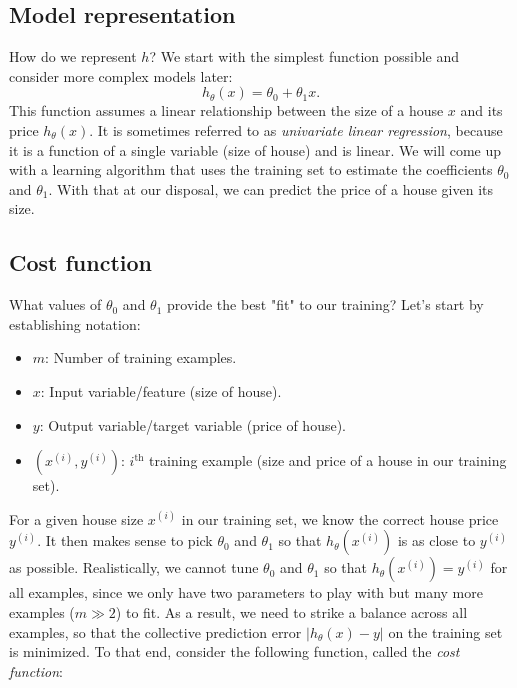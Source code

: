 \documentclass{article}
\theoremstyle{definition}
\begin{document}
\subsection{Model representation}
How do we represent $h$? We start with the simplest function possible and consider more complex models later:
\begin{equation}
    h_{\theta}(x) = \theta_0 + \theta_1 x.
    \label{linreg-eq:univar-hypothesis}
\end{equation}
This function assumes a linear relationship between the size of a house $x$ and its price $h_{\theta}(x)$. It is sometimes referred to as \textit{univariate linear regression}, because it is a function of a single variable (size of house) and is linear. We will come up with a learning algorithm that uses the training set to estimate the coefficients $\theta_0$ and $\theta_1$. With that at our disposal, we can predict the price of a house given its size. 

\subsection{Cost function}
What values of $\theta_0$ and $\theta_1$ provide the best "fit" to our training? Let's start by establishing notation:
\begin{itemize}
    \item $m$: Number of training examples.
    \item $x$: Input variable/feature (size of house).
    \item $y$: Output variable/target variable (price of house).
    \item $(x^{(i)}, y^{(i)})$: $i^{\text{th}}$ training example (size and price of a house in our training set).
\end{itemize}

For a given house size $x^{(i)}$ in our training set, we know the correct house price $y^{(i)}$. It then makes sense to pick $\theta_0$ and $\theta_1$ so that $h_{\theta}(x^{(i)})$ is as close to $y^{(i)}$ as possible. Realistically, we cannot tune $\theta_0$ and $\theta_1$ so that $h_{\theta}(x^{(i)})=y^{(i)}$ for all examples, since we only have two parameters to play with but many more examples ($m \gg 2$) to fit. As a result, we need to strike a balance across all examples, so that the collective prediction error $|h_{\theta}(x) - y|$ on the training set is minimized. To that end, consider the following function, called the \textit{cost function}:
\end{document}
